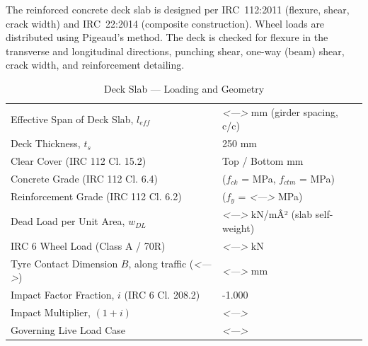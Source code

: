 \documentclass[12pt,a4paper]{report}
\numberwithin{figure}{chapter}
\newcommand{\placeholder}[1]{\textit{\textless #1\textgreater}}
\begin{document}
The reinforced concrete deck slab is designed per IRC~112:2011 (flexure, shear, crack width) and IRC~22:2014 (composite construction). Wheel loads are distributed using Pigeaud's method. The deck is checked for flexure in the transverse and longitudinal directions, punching shear, one-way (beam) shear, crack width, and reinforcement detailing.

\vspace{1em}
\begin{longtable}{|L{5.17cm}|L{9.41cm}|}
\caption{Deck Slab --- Loading and Geometry}\\
\hline
Effective Span of Deck Slab, $l_{eff}$ & \placeholder{---} mm (girder spacing, c/c) \\
\hline
Deck Thickness, $t_s$ & 250 mm \\
\hline
Clear Cover (IRC 112 Cl. 15.2) & Top  / Bottom  mm \\
\hline
Concrete Grade (IRC 112 Cl. 6.4) &  ($f_{ck}$ =  MPa, $f_{ctm}$ =  MPa) \\
\hline
Reinforcement Grade (IRC 112 Cl. 6.2) &  ($f_y$ = \placeholder{---} MPa) \\
\hline
Dead Load per Unit Area, $w_{DL}$ & \placeholder{---} kN/mÂ² (slab self-weight) \\
\hline
IRC 6 Wheel Load (Class A / 70R) & \placeholder{---} kN \\
\hline
Tyre Contact Dimension $B$, along traffic (\placeholder{---}) & \placeholder{---} mm \\
\hline
Impact Factor Fraction, $i$ (IRC 6 Cl. 208.2) & -1.000 \\
\hline
Impact Multiplier, $(1+i)$ & \placeholder{---} \\
\hline
Governing Live Load Case & \placeholder{---} \\
\hline
\end{longtable}
\end{document}
